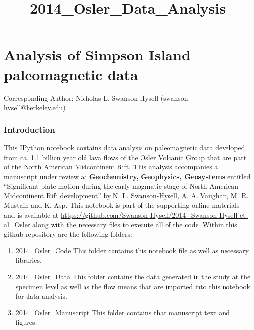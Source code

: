 \documentclass[letterpaper,10pt,english]{/Users/polarwander/Library/Enthought/Canopy_64bit/User/lib/python2.7/site-packages/sphinx/texinputs/sphinxhowto}
\title{2014\_Osler\_Data\_Analysis}
\begin{document}
        
            \maketitle
        

        


        
        \part{Analysis of Simpson Island paleomagnetic data}Corresponding Author: Nicholas L. Swanson-Hysell
(swanson-hysell@berkeley.edu)\section{Introduction}This IPython notebook contains data analysis on paleomagnetic data
developed from ca. 1.1 billion year old lava flows of the Osler Volcanic
Group that are part of the North American Midcontinent Rift. This
analysis accompanies a manuscript under review at \textbf{Geochemistry,
Geophysics, Geosystems} entitled ``Significant plate motion during the
early magmatic stage of North American Midcontinent Rift development''
by N. L. Swanson-Hysell, A. A. Vaughan, M. R. Mustain and K. Asp. This
notebook is part of the supporting online materials and is available at
\url{https://github.com/Swanson-Hysell/2014_Swanson-Hysell-et-al_Osler}
along with the necessary files to execute all of the code. Within this
github repository are the following folders:

\begin{enumerate}
\def\labelenumi{\arabic{enumi}.}
\itemsep1pt\parskip0pt
\item
  \href{https://github.com/Swanson-Hysell/2014_Swanson-Hysell-et-al_Osler/tree/master/2014_Osler_Code}{2014\_Osler\_Code}
  This folder contains this notebook file as well as necessary
  libraries.
\item
  \href{https://github.com/Swanson-Hysell/2014_Swanson-Hysell-et-al_Osler/tree/master/2014_Osler_Data}{2014\_Osler\_Data}
  This folder contains the data generated in the study at the specimen
  level as well as the flow means that are imported into this notebook
  for data analysis.
\item
  \href{https://github.com/Swanson-Hysell/2014_Swanson-Hysell-et-al_Osler/tree/master/2014_Osler_Manuscript_Files}{2014\_Osler\_Manuscript}
  This folder contains that manuscript text and figures.
\end{enumerate}
\end{document}
